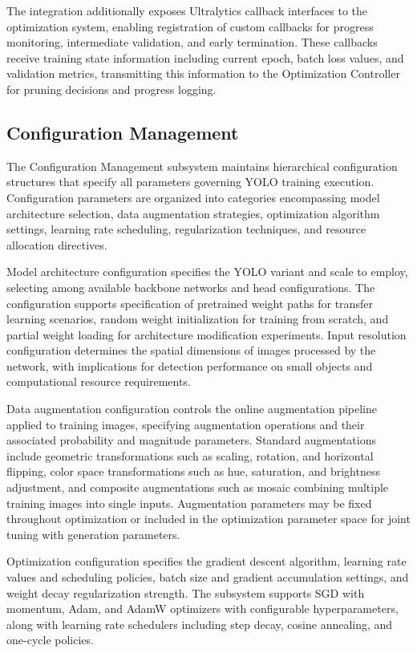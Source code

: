 The integration additionally exposes Ultralytics callback interfaces to the optimization system, enabling registration of custom callbacks for progress monitoring, intermediate validation, and early termination. These callbacks receive training state information including current epoch, batch loss values, and validation metrics, transmitting this information to the Optimization Controller for pruning decisions and progress logging.

\subsection{Configuration Management}

The Configuration Management subsystem maintains hierarchical configuration structures that specify all parameters governing YOLO training execution. Configuration parameters are organized into categories encompassing model architecture selection, data augmentation strategies, optimization algorithm settings, learning rate scheduling, regularization techniques, and resource allocation directives.

Model architecture configuration specifies the YOLO variant and scale to employ, selecting among available backbone networks and head configurations. The configuration supports specification of pretrained weight paths for transfer learning scenarios, random weight initialization for training from scratch, and partial weight loading for architecture modification experiments. Input resolution configuration determines the spatial dimensions of images processed by the network, with implications for detection performance on small objects and computational resource requirements.

Data augmentation configuration controls the online augmentation pipeline applied to training images, specifying augmentation operations and their associated probability and magnitude parameters. Standard augmentations include geometric transformations such as scaling, rotation, and horizontal flipping, color space transformations such as hue, saturation, and brightness adjustment, and composite augmentations such as mosaic combining multiple training images into single inputs. Augmentation parameters may be fixed throughout optimization or included in the optimization parameter space for joint tuning with generation parameters.

Optimization configuration specifies the gradient descent algorithm, learning rate values and scheduling policies, batch size and gradient accumulation settings, and weight decay regularization strength. The subsystem supports SGD with momentum, Adam, and AdamW optimizers with configurable hyperparameters, along with learning rate schedulers including step decay, cosine annealing, and one-cycle policies.

